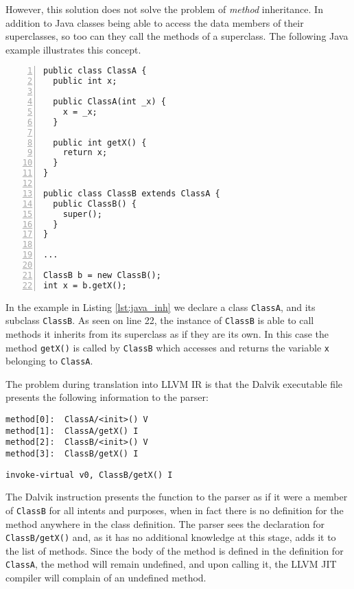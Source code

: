 However, this solution does not solve the problem of \emph{method} inheritance. In addition to Java classes being able to access the data members of their superclasses, so too can they call the methods of a superclass. The following Java example illustrates this concept.

\newpage

\lstset{
	language=Java,
	basicstyle=\small,
	stringstyle=\ttfamily
}

\begin{lstlisting}[frame=single, numbers=left, numberstyle=\tiny, caption={Java Method Inheritance}, label=lst:java_inh]
public class ClassA {
  public int x;
  
  public ClassA(int _x) {
    x = _x;
  }
  
  public int getX() {
    return x;
  }
}

public class ClassB extends ClassA {
  public ClassB() {
    super();
  }
}

...

ClassB b = new ClassB();
int x = b.getX();
\end{lstlisting}

In the example in Listing \ref{lst:java_inh} we declare a class \verb|ClassA|, and its subclass \verb|ClassB|. As seen on line 22, the instance of \verb|ClassB| is able to call methods it inherits from its superclass as if they are its own. In this case the method \verb|getX()| is called by \verb|ClassB| which accesses and returns the variable \verb|x| belonging to \verb|ClassA|.

The problem during translation into LLVM IR is that the Dalvik executable file presents the following information to the parser:

\lstset{
	language=Assembly,
	basicstyle=\small,
	stringstyle=\ttfamily
}

\begin{lstlisting}[frame=single]
method[0]:  ClassA/<init>() V
method[1]:  ClassA/getX() I
method[2]:  ClassB/<init>() V
method[3]:  ClassB/getX() I
\end{lstlisting}

\begin{lstlisting}[frame=single]
invoke-virtual v0, ClassB/getX() I
\end{lstlisting}

The Dalvik instruction presents the function to the parser as if it were a member of \verb|ClassB| for all intents and purposes, when in fact there is no definition for the method anywhere in the class definition. The parser sees the declaration for \verb|ClassB/getX()| and, as it has no additional knowledge at this stage, adds it to the list of methods. Since the body of the method is defined in the definition for \verb|ClassA|, the method will remain undefined, and upon calling it, the LLVM JIT compiler will complain of an undefined method.

